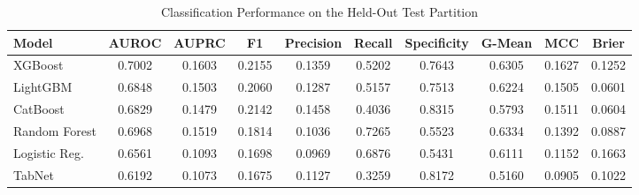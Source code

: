 \begin{table}
\centering
\caption{Classification Performance on the Held-Out Test Partition}
\label{tab:results}
\begin{tabular}{lccccccccc}
\toprule
Model & AUROC & AUPRC & F1 & Precision & Recall & Specificity & G-Mean & MCC & Brier \\
\midrule
XGBoost & 0.7002 & 0.1603 & 0.2155 & 0.1359 & 0.5202 & 0.7643 & 0.6305 & 0.1627 & 0.1252 \\
LightGBM & 0.6848 & 0.1503 & 0.2060 & 0.1287 & 0.5157 & 0.7513 & 0.6224 & 0.1505 & 0.0601 \\
CatBoost & 0.6829 & 0.1479 & 0.2142 & 0.1458 & 0.4036 & 0.8315 & 0.5793 & 0.1511 & 0.0604 \\
Random Forest & 0.6968 & 0.1519 & 0.1814 & 0.1036 & 0.7265 & 0.5523 & 0.6334 & 0.1392 & 0.0887 \\
Logistic Reg. & 0.6561 & 0.1093 & 0.1698 & 0.0969 & 0.6876 & 0.5431 & 0.6111 & 0.1152 & 0.1663 \\
TabNet & 0.6192 & 0.1073 & 0.1675 & 0.1127 & 0.3259 & 0.8172 & 0.5160 & 0.0905 & 0.1022 \\
\bottomrule
\end{tabular}
\end{table}
